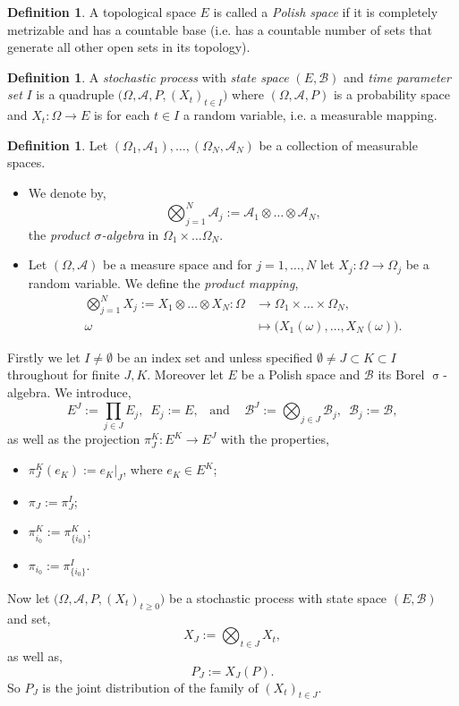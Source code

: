 \documentclass[a4paper, 12pt]{report}
\theoremstyle{cor}
\theoremstyle{remark}
\theoremstyle{definition}
\newtheorem{defn}[theorem]{Definition}
\begin{document}
\begin{defn}
A topological space $E$ is called a \emph{Polish space} if it is completely metrizable and has a countable base (i.e. has a countable number of sets that generate all other open sets in its topology).
\end{defn}

\begin{defn}
A \emph{stochastic process} with \emph{state space} $(E, \mathcal{B})$ and \emph{time parameter set} $I$ is a quadruple $\big(\Omega, \mathcal{A}, P, (X_t)_{t \in I}\big)$ where $(\Omega, \mathcal{A}, P)$ is a probability space and $X_t : \Omega \to E$ is for each $t \in I$ a random variable, i.e. a measurable mapping.
\end{defn}

\begin{defn}
Let $(\Omega_1, \mathcal{A}_1), \dots, (\Omega_N, \mathcal{A}_N)$ be a collection of measurable spaces.
\begin{itemize}
\item We denote by,
$$
\bigotimes_{j = 1}^N\mathcal{A}_j := \mathcal{A}_1 \otimes \dots \otimes \mathcal{A}_N,
$$
the \emph{product $\sigma$-algebra} in $\Omega_1 \times \dots \Omega_N$.

\item Let $(\Omega, \mathcal{A})$ be a measure space and for $j = 1, \dots, N$ let $X_j : \Omega \to \Omega_j$ be a random variable.  We define the \emph{product mapping},
$$
\begin{aligned}
\bigotimes_{j = 1}^NX_j := X_1 \otimes \dots \otimes X_N : \Omega & \to \Omega_1 \times \dots \times \Omega_N,\\
\omega & \mapsto \big(X_1(\omega), \dots, X_N(\omega)\big).
\end{aligned}
$$
\end{itemize}
\end{defn}
Firstly we let $I \ne \emptyset$ be an index set and unless specified $\emptyset \ne J \subset K \subset I$ throughout for finite $J, K$.  Moreover let $E$ be a Polish space and $\mathcal{B}$ its Borel $\upsigma$-algebra.  We introduce,
$$
E^J := \prod_{j \in J}E_j, \,\,\, E_j := E, \,\,\,\,\, \text{and } \,\,\,\,\, \mathcal{B}^J := \bigotimes_{j \in J}\mathcal{B}_j, \,\,\, \mathcal{B}_j := \mathcal{B},
$$
as well as the projection $\pi_J^K : E^K \to E^J$ with the properties,
\begin{itemize}
\item $\pi_J^K(e_K) := e_K|_J$, where $e_K \in E^K$;

\item $\pi_J := \pi_J^I$;

\item $\pi_{i_0}^K := \pi_{\{i_0\}}^K$;

\item $\pi_{i_0} := \pi_{\{i_0\}}^I$.
\end{itemize}
Now let $\big(\Omega, \mathcal{A}, P, (X_t)_{t\ge 0}\big)$ be a stochastic process with state space $(E, \mathcal{B})$ and set,
$$
X_J := \bigotimes_{t \in J}X_t,
$$
as well as,
\begin{equation}\label{FoFDD}
P_J := X_J(P).
\end{equation}
So $P_J$ is the joint distribution of the family of $(X_t)_{t \in J}$.
\end{document}
